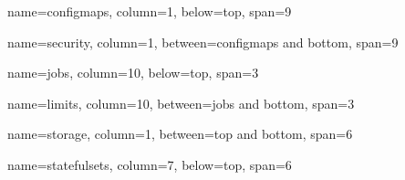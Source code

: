 \documentclass[8pt]{extarticle}
\begin{document}
\pagebreak

\begin{tcbposter}[
        poster = {spacing=0.6em, columns=12, height=\textheight},
        boxes = {},
        coverage={left=0pt, right=0pt, top=0pt, bottom=0pt},
    ]

    \begin{posterboxenv}[skin=cheatboxskin, adjusted title={ConfigMaps \& Secrets}]
        {name=configmaps, column=1, below=top, span=9}
        
    \end{posterboxenv}

    \begin{posterboxenv}[skin=cheatboxskin, adjusted title={Security}]
        {name=security, column=1, between=configmaps and bottom, span=9}
        
    \end{posterboxenv}

    \begin{posterboxenv}[skin=cheatboxskin, adjusted title={Jobs}]
        {name=jobs, column=10, below=top, span=3}
        
    \end{posterboxenv}

    \begin{posterboxenv}[skin=cheatboxskin, adjusted title={Typical Limits}]
        {name=limits, column=10, between=jobs and bottom, span=3}
        
    \end{posterboxenv}


\end{tcbposter}



\pagebreak


\begin{tcbposter}[
        poster = {spacing=0.6em, columns=12, height=\textheight},
        boxes = {},
        coverage={left=0pt, right=0pt, top=0pt, bottom=0pt},
    ]


    \begin{posterboxenv}[skin=cheatboxskin, adjusted title=Storage]
        {name=storage, column=1, between=top and bottom, span=6}
        
    \end{posterboxenv}

    \begin{posterboxenv}[skin=cheatboxskin, adjusted title=StatefulSets]
        {name=statefulsets, column=7, below=top, span=6}
        
    \end{posterboxenv}


\end{tcbposter}
\end{document}

